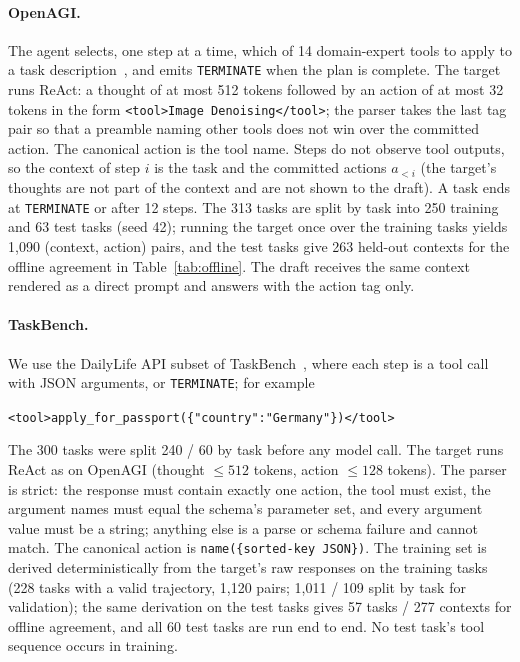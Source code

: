 \paragraph{OpenAGI.}
The agent selects, one step at a time, which of 14 domain-expert tools to
apply to a task description~\citep{openagi}, and emits \texttt{TERMINATE} when
the plan is complete. The target runs ReAct: a thought of at most 512 tokens
followed by an action of at most 32 tokens in the form
\texttt{<tool>Image Denoising</tool>}; the parser takes the last tag pair so
that a preamble naming other tools does not win over the committed action. The
canonical action is the tool name. Steps do not observe tool outputs, so the
context of step $i$ is the task and the committed actions $a_{<i}$ (the target's
thoughts are not part of the context and are not shown to the draft). A task
ends at \texttt{TERMINATE} or after 12 steps. The 313 tasks are split by task
into 250 training and 63 test tasks (seed 42); running the target once over the
training tasks yields 1{,}090 (context, action) pairs, and the test tasks give
263 held-out contexts for the offline agreement in Table~\ref{tab:offline}. The
draft receives the same context rendered as a direct prompt and answers with
the action tag only.

\paragraph{TaskBench.}
We use the DailyLife API subset of TaskBench~\citep{taskbench}, where each
step is a tool call with JSON
arguments, or \texttt{TERMINATE}; for example\par\noindent\hspace*{1.5em}%
\texttt{<tool>apply\_for\_passport(\{"country":"Germany"\})</tool>}\par\noindent The 300 tasks were split 240 / 60 by task before any
model call. The target runs ReAct as on OpenAGI (thought $\le 512$ tokens, action
$\le 128$ tokens). The parser is strict: the response must contain exactly one
action, the tool must exist, the argument names must equal the schema's
parameter set, and every argument value must be a string; anything else is a
parse or schema failure and cannot match. The canonical action is
\texttt{name(\{sorted-key JSON\})}. The training set is derived
deterministically from the target's raw responses on the training tasks
(228 tasks with a valid trajectory, 1{,}120 pairs; 1{,}011 / 109 split by task
for validation); the same derivation on the test tasks gives 57 tasks / 277
contexts for offline agreement, and all 60 test tasks are run end to end. No
test task's tool sequence occurs in training.


